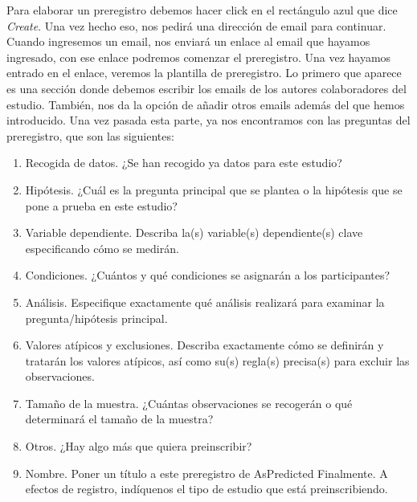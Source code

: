 \documentclass[
  spanish,
  letterpaper,
  DIV=11,
  numbers=noendperiod]{scrreprt}
\providecommand{\tightlist}{%
  \setlength{\itemsep}{0pt}\setlength{\parskip}{0pt}}
\begin{document}
Para elaborar un preregistro debemos hacer click en el rectángulo azul
que dice \emph{Create}. Una vez hecho eso, nos pedirá una dirección de
email para continuar. Cuando ingresemos un email, nos enviará un enlace
al email que hayamos ingresado, con ese enlace podremos comenzar el
preregistro. Una vez hayamos entrado en el enlace, veremos la plantilla
de preregistro. Lo primero que aparece es una sección donde debemos
escribir los emails de los autores colaboradores del estudio. También,
nos da la opción de añadir otros emails además del que hemos
introducido. Una vez pasada esta parte, ya nos encontramos con las
preguntas del preregistro, que son las siguientes:

\begin{enumerate}
\def\labelenumi{\arabic{enumi})}
\tightlist
\item
  Recogida de datos. ¿Se han recogido ya datos para este estudio?
\item
  Hipótesis. ¿Cuál es la pregunta principal que se plantea o la
  hipótesis que se pone a prueba en este estudio?
\item
  Variable dependiente. Describa la(s) variable(s) dependiente(s) clave
  especificando cómo se medirán.
\item
  Condiciones. ¿Cuántos y qué condiciones se asignarán a los
  participantes?
\item
  Análisis. Especifique exactamente qué análisis realizará para examinar
  la pregunta/hipótesis principal.
\item
  Valores atípicos y exclusiones. Describa exactamente cómo se definirán
  y tratarán los valores atípicos, así como su(s) regla(s) precisa(s)
  para excluir las observaciones.
\item
  Tamaño de la muestra. ¿Cuántas observaciones se recogerán o qué
  determinará el tamaño de la muestra?
\item
  Otros. ¿Hay algo más que quiera preinscribir?
\item
  Nombre. Poner un título a este preregistro de AsPredicted Finalmente.
  A efectos de registro, indíquenos el tipo de estudio que está
  preinscribiendo.
\end{enumerate}
\end{document}
